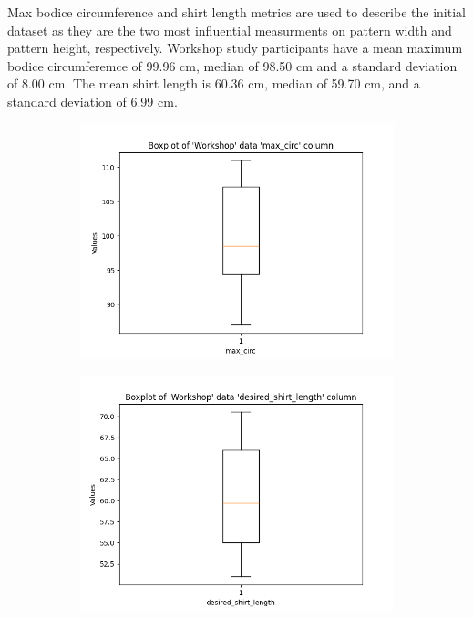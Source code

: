 Max bodice circumference and shirt length metrics are used to describe the initial dataset as they are the two most influential measurments on pattern width and pattern height, respectively.
Workshop study participants have a mean maximum bodice circumferemce of 99.96 cm, median of 98.50 cm and a standard deviation of 8.00 cm. The mean shirt length is 60.36 cm, median of 59.70 cm, and a standard deviation of 6.99 cm.
\begin{figure}[htb]
    \centering
    \begin{subfigure}[b]{0.45\textwidth}
        \centering
        \includegraphics[width=\textwidth]{Images/Workshop_max_circ_Boxplot.png}
        \caption{}
    \end{subfigure}
    \hfill
    \begin{subfigure}[b]{0.45\textwidth}
        \centering
        \includegraphics[width=\textwidth]{Images/Workshop_desired_shirt_length_Boxplot.png}
        \caption{}
    \end{subfigure}
    \caption{}
\end{figure}

